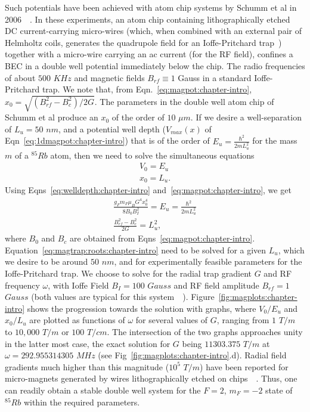 Such potentials have been achieved with atom chip systems by Schumm et al in 2006~\cite{doublewell:chip}~\cite{doublewell:chip:nature}. In these experiments, an atom chip containing lithographically etched DC current-carrying micro-wires (which, when combined with an external pair of Helmholtz coils, generates the quadrupole field for an Ioffe-Pritchard trap~\cite{pethick:bec}) together with a micro-wire carrying an ac current (for the RF field), confines a BEC in a double well potential immediately below the chip. The radio frequencies of about $500$ $KHz$ and magnetic fields $B_{rf}\equiv 1$ Gauss in a standard Ioffe-Pritchard trap. We note that, from Eqn.~\ref{eq:magpot:chapter-intro}, $x_0=\sqrt{\left(B_{rf}^2-B^2_c\right)/2G}$. The parameters in the double well atom chip of Schumm et al produce an $x_0$ of the order of $10$ $\mu m$. If we desire a well-separation of $L_u=50$ $nm$, and a potential well depth ($V_{max}(x)$ of Eqn~\ref{eq:1dmagpot:chapter-intro}) that is of the order of $E_u=\frac{\hbar^2}{2mL_u^2}$ for the mass $m$ of a $^{85}Rb$ atom, then we need to solve the simultaneous equations
\begin{eqnarray}
V_0=E_u \nonumber \\
x_0=L_u.
\label{eq:magpot:roots:chapter-intro}
\end{eqnarray}
Using Eqns~\ref{eq:welldepth:chapter-intro} and~\ref{eq:magpot:chapter-intro}, we get
\begin{eqnarray}
\frac{g_Fm_F\mu_BG^4x^4_0}{8B_0B^2_I}=E_u=\frac{\hbar^2}{2mL^2_u} \nonumber \\
\frac{B^2_{rf}-B^2_c}{2G} = L^2_u,
\label{eq:magtrap:roots:chapter-intro}
\end{eqnarray}
where $B_0$ and $B_c$ are obtained from Eqns~\ref{eq:magpot:chapter-intro}. Equation~\ref{eq:magtrap:roots:chapter-intro} need to be solved for a given $L_u$, which we desire to be around $50$ $nm$, and for experimentally feasible parameters for the Ioffe-Pritchard trap. We choose to solve for the radial trap gradient $G$ and RF frequency $\omega$, with Ioffe Field $B_I=100$ $Gauss$ and RF field amplitude $B_{rf}=1$ $Gauss$ (both values are typical for this system~\cite{Pritchard:trapgradients}~\cite{doublewell:chip}). Figure~\ref{fig:magplots:chapter-intro} shows the progression towards the solution with graphs, where $V_0/E_u$ and $x_0/L_u$ are plotted as functions of $\omega$ for several values of $G$, ranging from $1$ $T/m$ to $10,000$ $T/m$ or $100$ $T/cm$. The intersection of the two graphs approaches unity in the latter most case, the exact solution for $G$ being $11303.375$ $T/m$ at $\omega=292.955314305$ $MHz$ (see Fig~\ref{fig:magplots:chapter-intro}.d). Radial field gradients much higher than this magnitude ($10^5$ $T/m$) have been reported for micro-magnets generated by wires lithographically etched on chips~\cite{drndic:higrad}~\cite{lev:highgrad}. Thus, one can readily obtain a stable double well system for the $F=2$, $m_F=-2$ state of $^{85}Rb$ within the required parameters. 
